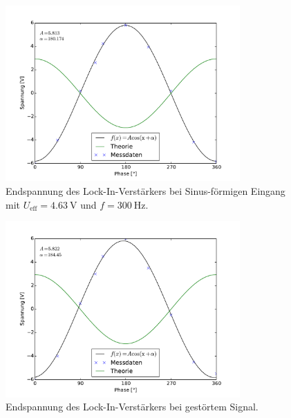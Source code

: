 \begin{figure}[hp]
	\centering
	\includegraphics[width=0.8\textwidth]{Bilder/AusgangSpannung.pdf}
	\caption{Endspannung des Lock-In-Verstärkers bei Sinus-förmigen Eingang mit $U_\text{eff} = \SI{4.63}{\volt}$ und $f = \SI{300}{\hertz}$.}
	\label{diag:spannung}
\end{figure}
\begin{figure}[hp]
	\centering
	\includegraphics[width=0.8\textwidth]{Bilder/AusgangStoerung.pdf}
	\caption{Endspannung des Lock-In-Verstärkers bei gestörtem Signal.}
	\label{diag:stoerung}
\end{figure}

